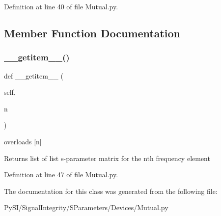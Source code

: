 Definition at line 40 of file Mutual.\+py.



\subsection{Member Function Documentation}
\mbox{\label{classSignalIntegrity_1_1SParameters_1_1Devices_1_1Mutual_1_1Mutual_ab7a6da5139e0878b590d68292aaa70f2}} 
\subsubsection{\texorpdfstring{\+\_\+\+\_\+getitem\+\_\+\+\_\+()}{\_\_getitem\_\_()}}
{\footnotesize\ttfamily def \+\_\+\+\_\+getitem\+\_\+\+\_\+ (\begin{DoxyParamCaption}\item[{}]{self,  }\item[{}]{n }\end{DoxyParamCaption})}



overloads \mbox{[}n\mbox{]} 

\begin{DoxyReturn}{Returns}
list of list s-\/parameter matrix for the nth frequency element 
\end{DoxyReturn}


Definition at line 47 of file Mutual.\+py.



The documentation for this class was generated from the following file\+:\begin{DoxyCompactItemize}
\item 
Py\+S\+I/\+Signal\+Integrity/\+S\+Parameters/\+Devices/Mutual.\+py\end{DoxyCompactItemize}
